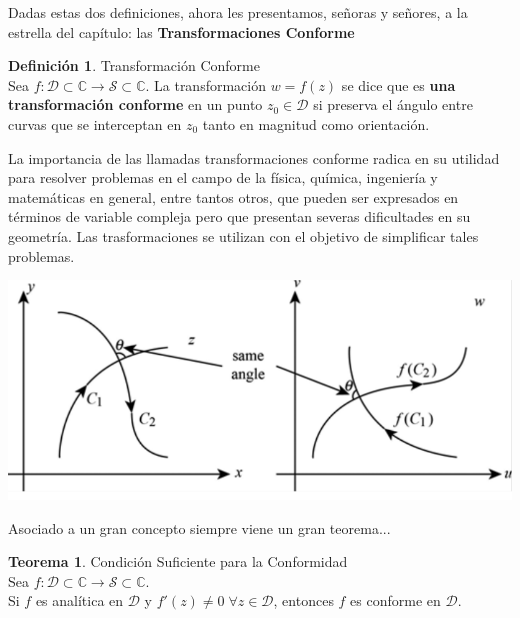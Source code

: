 \documentclass[12pt]{article}
\theoremstyle{definition}
\newtheorem{definition}{Definici\'on}[section]
\theoremstyle{theorem}
\newtheorem{theorem}{Teorema}[section]
\theoremstyle{corolary}
\begin{document}
Dadas estas dos definiciones, ahora les presentamos, se\~noras y se\~nores, a la estrella del cap\'itulo: las \textbf{Transformaciones Conforme}\\

\colorbox{red!40!white!80}{\parbox{\linewidth}{
 \theoremstyle{definition}
 \begin{definition}{Transformaci\'on Conforme}\\
  	Sea $f: \mathcal{D} \subset \mathbb{C} \rightarrow \mathcal{S}\subset \mathbb{C}$. La transformaci\'on $w = f(z)$ se dice que es \textbf{una transformaci\'on conforme} en un punto $z_0 \in \mathcal{D}$ si preserva el \'angulo entre curvas que se interceptan en $z_0$ tanto en magnitud como orientaci\'on.

 \end{definition}}}
\linebreak

\begin{multicols}{2}
La importancia de las llamadas transformaciones conforme radica en su utilidad para resolver problemas en el campo de la f\'isica, qu\'imica, ingenier\'ia y matem\'aticas en general, entre tantos otros, que pueden ser expresados en t\'erminos de variable compleja pero que presentan severas dificultades en su geometr\'ia. Las trasformaciones se utilizan con el objetivo de simplificar tales problemas.

\begin{center}
	\includegraphics[scale=0.39]{conformal.png}
\end{center}
\end{multicols}

Asociado a un gran concepto siempre viene un gran teorema...\\

\colorbox{magenta!40!white!80}{\parbox{\linewidth}{
\theoremstyle{theorem}
\begin{theorem} {Condici\'on Suficiente para la Conformidad}\\
Sea $f: \mathcal{D} \subset \mathbb{C} \rightarrow \mathcal{S}\subset \mathbb{C}$.\\
Si $f$ es anal\'itica en $\mathcal{D}$ y $f'(z)\neq 0 \;\forall z \in \mathcal{D}$, entonces $f$ es conforme en $\mathcal{D}$.
\end{theorem}}}
\end{document}

